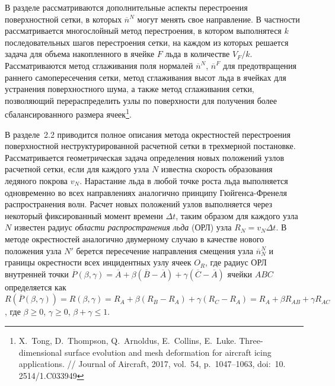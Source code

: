 \documentclass[a4paper,14pt]{extarticle}                     %
\theoremstyle{plain}                                         %
\begin{document}
В разделе рассматриваются дополнительные аспекты перестроения поверхностной сетки, в которых $\overline{n}^N$ могут менять свое направление.
В частности рассматривается многослойный метод перестроения, в котором выполнятеся $k$ последовательных шагов перестроения сетки, на каждом из которых решается задача для объема накопленного в ячейке $F$ льда в количестве $V_F/k$.
Рассматриваются метод сглаживания поля нормалей $\overline{n}^N$, $\overline{n}^F$ для предотвращения раннего самопересечения сетки, метод сглаживания высот льда в ячейках для устранения поверхностного шума, а также метод сглаживания сетки, позволяющий перераспределить узлы по поверхности для получения более сбалансированного размера ячеек\footnote[3]{X.~Tong, D.~Thompson, Q.~Arnoldus, E.~Collins, E.~Luke. Three-dimensional surface evolution and mesh deformation for aircraft icing applications. // Journal of Aircraft, 2017, vol.~54, p.~1047–1063, doi:~10.
2514/1.C033949}.


В разделе~2.2 приводится полное описания метода окрестностей перестроения поверхностной неструктурированной расчетной сетки в трехмерной постановке.
Рассматривается геометрическая задача определения новых положений узлов расчетной сетки, если для каждого узла $N$ известна скорость образования ледяного покрова $v_N$.
Нарастание льда в любой точке роста льда выполняется одновременно во всех направлениях аналогично принципу Гюйгенса-Френеля распространения волн.
Расчет новых положений узлов выполняется через некоторый фиксированный момент времени $\Delta t$, таким образом для каждого узла $N$ известен радиус \textit{области распространения льда} (ОРЛ) узла $R_N = v_N \Delta t$.
В методе окрестностей аналогично двумерному случаю в качестве нового положения узла $N'$ берется пересечение направления смещения узла $\overline{n}_N^N$ и границы окрестности всех инцидентных узлу ячеек $O_R$, где радиус ОРЛ внутренней точки $\overline{P}(\beta, \gamma) = \overline{A} + \beta (\overline{B} - \overline{A}) + \gamma (\overline{C} - \overline{A})$ ячейки $ABC$ определяется как $R(\overline{P}(\beta,\gamma)) = R(\beta,\gamma) = R_A + \beta(R_B - R_A) + \gamma(R_C - R_A) = R_A + \beta R_{AB} + \gamma R_{AC}$, где $\beta \ge 0$, $\gamma \ge 0$, $\beta + \gamma \le 1$.
\end{document}
